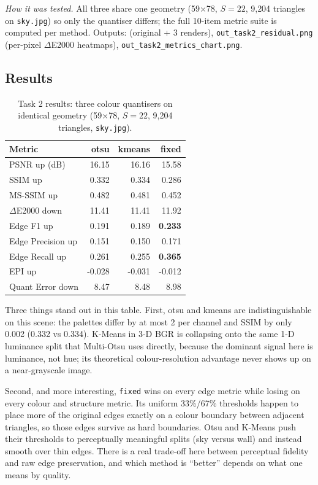 \documentclass[11pt,a4paper]{article}
\begin{document}
\emph{How it was tested.} All three share one geometry (59$\times$78, $S=22$,
9{,}204 triangles on \texttt{sky.jpg}) so only the quantiser differs; the full
10-item metric suite is computed per method. Outputs:
 (original + 3 renders),
\texttt{out\_task2\_residual.png} (per-pixel $\Delta$E2000 heatmaps),
\texttt{out\_task2\_metrics\_chart.png}.

\FloatBarrier
\FloatBarrier
\subsection{Results}

\begin{table}[htbp]
\centering
\begin{tabular}{@{}l r r r@{}}
\toprule
\textbf{Metric} & \textbf{otsu} & \textbf{kmeans} & \textbf{fixed}\\
\midrule
PSNR up (dB)           & 16.15 & 16.16 & 15.58 \\
SSIM up                & 0.332 & 0.334 & 0.286 \\
MS-SSIM up             & 0.482 & 0.481 & 0.452 \\
$\Delta$E2000 down     & 11.41 & 11.41 & 11.92 \\
Edge F1 up             & 0.191 & 0.189 & \textbf{0.233} \\
Edge Precision up      & 0.151 & 0.150 & 0.171 \\
Edge Recall up         & 0.261 & 0.255 & \textbf{0.365} \\
EPI up                 & -0.028 & -0.031 & -0.012 \\
Quant Error down       & 8.47 & 8.48 & 8.98 \\
\bottomrule
\end{tabular}
\caption{Task 2 results: three colour quantisers on identical geometry
(59$\times$78, $S=22$, 9{,}204 triangles, \texttt{sky.jpg}).}
\label{tab:t2}
\end{table}

Three things stand out in this table. First, otsu and kmeans are
indistinguishable on this scene: the palettes differ by at most 2 per channel
and SSIM by only 0.002 (0.332 vs 0.334). K-Means in 3-D BGR is collapsing onto
the same 1-D luminance split that Multi-Otsu uses directly, because the
dominant signal here is luminance, not hue; its theoretical colour-resolution
advantage never shows up on a near-grayscale image.

Second, and more interesting, \texttt{fixed} wins on every edge metric while
losing on every colour and structure metric. Its uniform 33\%/67\% thresholds
happen to place more of the original edges exactly on a colour boundary between
adjacent triangles, so those edges survive as hard boundaries. Otsu and K-Means
push their thresholds to perceptually meaningful splits (sky versus wall) and
instead smooth over thin edges. There is a real trade-off here between
perceptual fidelity and raw edge preservation, and which method is ``better''
depends on what one means by quality.
\end{document}
